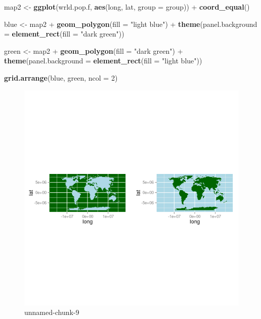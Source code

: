 \documentclass[]{article}
\makeatletter
\newenvironment{Shaded}{}{}
\newcommand{\KeywordTok}[1]{\textcolor[rgb]{0.00,0.44,0.13}{\textbf{{#1}}}}
\newcommand{\DataTypeTok}[1]{\textcolor[rgb]{0.56,0.13,0.00}{{#1}}}
\newcommand{\DecValTok}[1]{\textcolor[rgb]{0.25,0.63,0.44}{{#1}}}
\newcommand{\StringTok}[1]{\textcolor[rgb]{0.25,0.44,0.63}{{#1}}}
\newcommand{\NormalTok}[1]{{#1}}
\def\maxwidth{\ifdim\Gin@nat@width>\linewidth\linewidth
\else\Gin@nat@width\fi}
\let\Oldincludegraphics\includegraphics
\renewcommand{\includegraphics}[1]{\Oldincludegraphics[width=\maxwidth]{#1}}
\makeatother
\begin{document}
\begin{Shaded}
\begin{Highlighting}[]
\NormalTok{map2 <- }\KeywordTok{ggplot}\NormalTok{(wrld.pop.f, }\KeywordTok{aes}\NormalTok{(long, lat, }\DataTypeTok{group =} \NormalTok{group)) + }\KeywordTok{coord_equal}\NormalTok{()}

\NormalTok{blue <- map2 + }\KeywordTok{geom_polygon}\NormalTok{(}\DataTypeTok{fill =} \StringTok{"light blue"}\NormalTok{) + }\KeywordTok{theme}\NormalTok{(}\DataTypeTok{panel.background =} \KeywordTok{element_rect}\NormalTok{(}\DataTypeTok{fill =} \StringTok{"dark green"}\NormalTok{))}

\NormalTok{green <- map2 + }\KeywordTok{geom_polygon}\NormalTok{(}\DataTypeTok{fill =} \StringTok{"dark green"}\NormalTok{) + }\KeywordTok{theme}\NormalTok{(}\DataTypeTok{panel.background =} \KeywordTok{element_rect}\NormalTok{(}\DataTypeTok{fill =} \StringTok{"light blue"}\NormalTok{))}

\KeywordTok{grid.arrange}\NormalTok{(blue, green, }\DataTypeTok{ncol =} \DecValTok{2}\NormalTok{)}
\end{Highlighting}
\end{Shaded}
\begin{figure}[htbp]
\centering
\includegraphics{figure/unnamed-chunk-9.png}
\caption{unnamed-chunk-9}
\end{figure}
\end{document}
